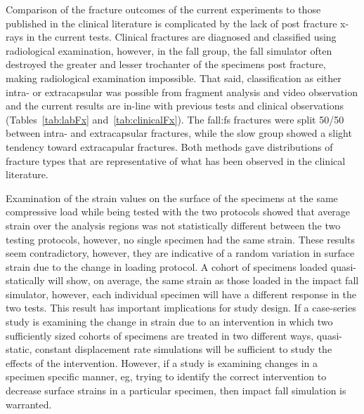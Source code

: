 Comparison of the fracture outcomes of the current experiments to those published in the clinical literature is complicated by the lack of post fracture x-rays in the current tests.
Clinical fractures are diagnosed and classified using radiological examination, however, in the fall group, the fall simulator often destroyed the greater and lesser trochanter of the specimens post fracture, making radiological examination impossible.
That said, classification as either intra- or extracapsular was possible from fragment analysis and video observation and the current results are in-line with previous tests and clinical observations (Tables~\ref{tab:labFx} and~\ref{tab:clinicalFx}).
The fall:\ac{fs} fractures were split 50/50 between intra- and extracapsular fractures, while the slow group showed a slight tendency toward extracapular fractures.
Both methods gave distributions of fracture types that are representative of what has been observed in the clinical literature.

Examination of the strain values on the surface of the specimens at the same compressive load while being tested with the two protocols showed that average strain over the analysis regions was not statistically different between the two testing protocols, however, no single specimen had the same strain.
These results seem contradictory, however, they are indicative of a random variation in surface strain due to the change in loading protocol.
A cohort of specimens loaded quasi-statically will show, on average, the same strain as those loaded in the impact fall simulator, however, each individual specimen will have a different response in the two tests.
This result has important implications for study design.
If a case-series study is examining the change in strain due to an intervention in which two sufficiently sized cohorts of specimens are treated in two different ways, quasi-static, constant displacement rate simulations will be sufficient to study the effects of the intervention.
However, if a study is examining changes in a specimen specific manner, \ac{eg}, trying to identify the correct intervention to decrease surface strains in a particular specimen, then impact fall simulation is warranted.

